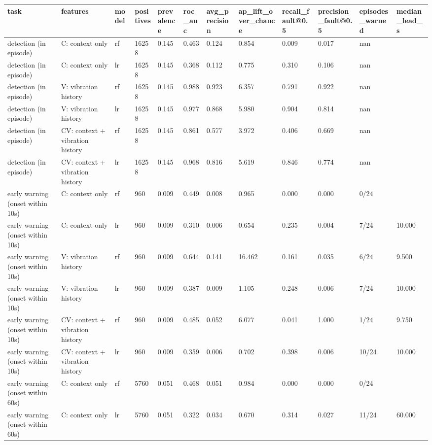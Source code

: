\begin{tabular}{llllllllllll}
\toprule
task & features & model & positives & prevalence & roc\_auc & avg\_precision & ap\_lift\_over\_chance & recall\_fault@0.5 & precision\_fault@0.5 & episodes\_warned & median\_lead\_s \\
\midrule
detection (in episode) & C: context only & rf & 16258 & 0.145 & 0.463 & 0.124 & 0.854 & 0.009 & 0.017 & nan &  \\
detection (in episode) & C: context only & lr & 16258 & 0.145 & 0.368 & 0.112 & 0.775 & 0.310 & 0.106 & nan &  \\
detection (in episode) & V: vibration history & rf & 16258 & 0.145 & 0.988 & 0.923 & 6.357 & 0.791 & 0.922 & nan &  \\
detection (in episode) & V: vibration history & lr & 16258 & 0.145 & 0.977 & 0.868 & 5.980 & 0.904 & 0.814 & nan &  \\
detection (in episode) & CV: context + vibration history & rf & 16258 & 0.145 & 0.861 & 0.577 & 3.972 & 0.406 & 0.669 & nan &  \\
detection (in episode) & CV: context + vibration history & lr & 16258 & 0.145 & 0.968 & 0.816 & 5.619 & 0.846 & 0.774 & nan &  \\
early warning (onset within 10s) & C: context only & rf & 960 & 0.009 & 0.449 & 0.008 & 0.965 & 0.000 & 0.000 & 0/24 &  \\
early warning (onset within 10s) & C: context only & lr & 960 & 0.009 & 0.310 & 0.006 & 0.654 & 0.235 & 0.004 & 7/24 & 10.000 \\
early warning (onset within 10s) & V: vibration history & rf & 960 & 0.009 & 0.644 & 0.141 & 16.462 & 0.161 & 0.035 & 6/24 & 9.500 \\
early warning (onset within 10s) & V: vibration history & lr & 960 & 0.009 & 0.387 & 0.009 & 1.105 & 0.248 & 0.006 & 7/24 & 10.000 \\
early warning (onset within 10s) & CV: context + vibration history & rf & 960 & 0.009 & 0.485 & 0.052 & 6.077 & 0.041 & 1.000 & 1/24 & 9.750 \\
early warning (onset within 10s) & CV: context + vibration history & lr & 960 & 0.009 & 0.359 & 0.006 & 0.702 & 0.398 & 0.006 & 10/24 & 10.000 \\
early warning (onset within 60s) & C: context only & rf & 5760 & 0.051 & 0.468 & 0.051 & 0.984 & 0.000 & 0.000 & 0/24 &  \\
early warning (onset within 60s) & C: context only & lr & 5760 & 0.051 & 0.322 & 0.034 & 0.670 & 0.314 & 0.027 & 11/24 & 60.000 \\

\end{tabular}
